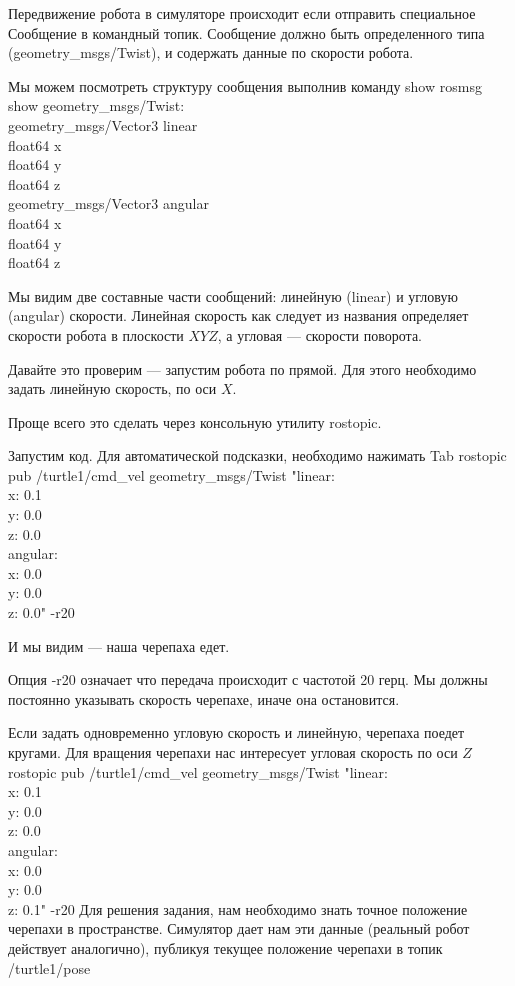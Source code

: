 Передвижение робота в симуляторе происходит если отправить специальное Сообщение в командный топик. Сообщение должно быть определенного типа \linebreak (geometry\_msgs/Twist), и содержать данные по скорости робота.

Мы можем посмотреть структуру сообщения выполнив команду show rosmsg show geometry\_msgs/Twist:\\
geometry\_msgs/Vector3 linear\\
	float64 x\\  
	float64 y\\  
	float64 z\\
geometry\_msgs/Vector3 angular\\
  float64 x\\
  float64 y\\
  float64 z

Мы видим две составные части сообщений: линейную (linear) и угловую (angular) скорости. Линейная скорость как следует из названия определяет скорости робота в плоскости $XYZ$, а угловая — скорости поворота.

Давайте это проверим — запустим робота по прямой. Для этого необходимо задать линейную скорость, по оси $X$.

Проще всего это сделать через консольную утилиту rostopic.

Запустим код. Для автоматической подсказки, необходимо нажимать Tab
rostopic pub /turtle1/cmd\_vel geometry\_msgs/Twist "linear:\\
  x: 0.1\\
  y: 0.0\\
  z: 0.0\\
angular:\\
  x: 0.0\\
  y: 0.0\\
  z: 0.0" -r20

И мы видим — наша черепаха едет.

Опция -r20 означает что передача происходит с частотой 20 герц. Мы должны постоянно указывать скорость черепахе, иначе она остановится.

Если задать одновременно угловую скорость и линейную, черепаха поедет кругами. Для вращения черепахи нас интересует угловая скорость по оси $Z$
rostopic pub /turtle1/cmd\_vel geometry\_msgs/Twist "linear:\\
  x: 0.1\\
  y: 0.0\\
  z: 0.0\\
angular:\\
  x: 0.0\\
  y: 0.0\\
  z: 0.1" -r20
Для решения задания, нам необходимо знать точное положение черепахи в пространстве. Симулятор дает нам эти данные (реальный робот действует аналогично), публикуя текущее положение черепахи в топик /turtle1/pose

